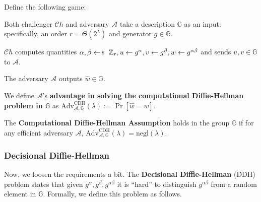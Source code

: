 \documentclass[../../book.tex]{subfiles}
\begin{document}
\begin{definition}
    Define the following game:
    \begin{algoen}
        \item Both challenger $\mathcal{C}h$ and adversary $\mathcal{A}$ take a description $\mathbb{G}$ as an input: specifically, an order $r=\Theta(2^{\lambda})$ and generator $g \in \mathbb{G}$.
        \item $\mathcal{C}h$ computes quantities $\alpha, \beta \leftarrowS \mathbb{Z}_r, u \gets g^{\alpha}, v \gets g^{\beta}, w \gets g^{\alpha\beta}$ and sends $u,v \in \mathbb{G}$ to $\mathcal{A}$.
        \item The adversary $\mathcal{A}$ outputs $\widehat{w} \in \mathbb{G}$.
    \end{algoen}

    We define $\mathcal{A}$'s \textbf{advantage in solving the computational Diffie-Hellman problem in $\mathbb{G}$}
    as $\text{Adv}^{\text{CDH}}_{\mathcal{A},\mathbb{G}}(\lambda) := \Pr[\widehat{w} = w]$.
\end{definition}

\begin{definition}
    The \textbf{Computational Diffie-Hellman Assumption} holds in the group $\mathbb{G}$ if for any efficient 
    adversary $\mathcal{A}$, $\text{Adv}^{\text{CDH}}_{\mathcal{A},\mathbb{G}}(\lambda)=\text{negl}(\lambda)$.
\end{definition}

\subsubsection{Decisional Diffie-Hellman}

Now, we loosen the requirements a bit. The \textbf{Decisional Diffie-Hellman} (DDH) problem \cite[chapter 16]{Dan_Boneh_2023} 
states that given $g^{\alpha},g^{\beta},g^{\alpha\beta}$ it is ``hard'' to distinguish $g^{\alpha\beta}$ from a 
random element in $\mathbb{G}$. Formally, we define this problem as follows.
\end{document}
